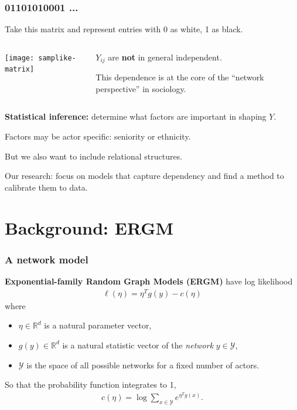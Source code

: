 \documentclass[ 10pt]{beamer}
\def\RR{{\mathbb R}}
\def\YY{{\mathcal Y}}
\newcommand{\fatdot}{\,\cdot\,}
\newcommand{\inner}[1]{\langle #1 \rangle}
\begin{document}
{
\frametitle{01101010001 ...}
Take this matrix and represent entries with 0 as white, 1 as black.
\pause
\begin{columns}[T]
\begin{column}[T]{0.4\textwidth}
\texttt{[image: samplike-matrix]}
\end{column}
\pause
\begin{column}[T]{0.6\textwidth}
\vspace{5mm}

$Y_{ij}$ are \textbf{not} in general independent.
\vspace{2mm}

This dependence is at the core of the ``network perspective'' in sociology.
\end{column}
\end{columns}
\vspace{2mm}

\pause
\textbf{Statistical inference:} determine what factors are important in shaping 
$Y$.
\vspace{1mm}

Factors may be actor specific: seniority or ethnicity.

But we also want to include relational structures.


\begin{block}{}
Our research: focus on models that capture dependency and find a method to calibrate them to data.
\end{block}
}
\section{Background: ERGM}
\frame
{
\frametitle{A network model}


\textbf{Exponential-family Random Graph Models (ERGM)} have log likelihood
\begin{align*}%
	\ell( \eta) = \eta^T g(y) - c(\eta)
\end{align*}
where 
\begin{itemize}
\item $\eta \in \RR^d$ is a natural parameter vector,
\item $g(y)\in\RR^d$ is a natural statistic vector of the \emph{network} $y\in \YY$,
\item $\YY$ is the space of all possible networks for a fixed number of actors.
\end{itemize}
\vspace{2mm}

So that the probability function integrates to 1,
\begin{align*}
	c(\eta) = \log \sum_{x \in \YY} e^{\eta^T g(x) }.
\end{align*}
}
\end{document}
